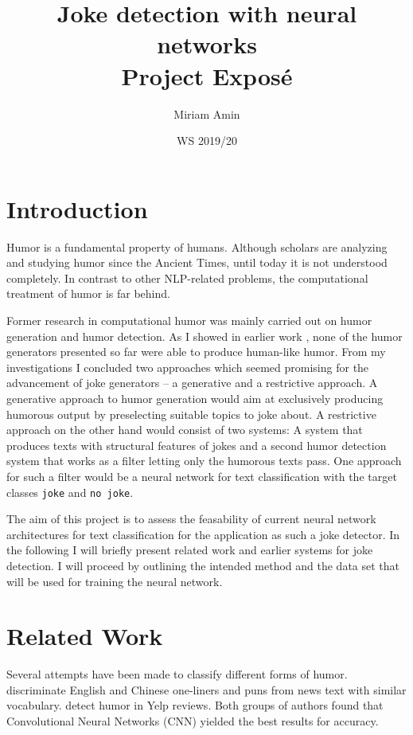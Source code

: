 \documentclass[12pt]{scrartcl}
\title{%
	Joke detection with neural networks \\
	\large Project Exposé}
\author{Miriam Amin}
\date{WS 2019/20}
\begin{document}
\maketitle

\section{Introduction}
Humor is a fundamental property of humans. Although scholars are analyzing and studying humor since the Ancient Times, until today it is not understood completely. In contrast to other NLP-related problems, the computational treatment of humor is far behind. 

Former research in computational humor was mainly carried out on humor generation and humor detection. As I showed in earlier work \citep{aminComputationalHumorAutomatic2019}, none of the humor generators presented so far were able to produce human-like humor. From my investigations I concluded two approaches which seemed promising for the advancement of joke generators -- a generative and a restrictive approach. A generative approach to humor generation would aim at exclusively producing humorous output by preselecting suitable topics to joke about. A restrictive approach on the other hand would consist of two systems: A system that produces texts with structural features of jokes and a second humor detection system that works as a filter letting only the humorous texts pass.  
One approach for such a filter would be a neural network for text classification with the target classes \texttt{joke} and \texttt{no joke}.

The aim of this project is to assess the feasability of current neural network architectures for text classification for the application as such a joke detector. In the following I will briefly present related work and earlier systems for joke detection. I will proceed by outlining the intended method and the data set that will be used for training the neural network. 

 

\section{Related Work}
Several attempts have been made to classify different forms of humor. \cite{chenHumorRecognitionUsing2018} discriminate English and Chinese one-liners and puns from news text with similar vocabulary. \cite{oliveiraHumorDetectionYelp2015} detect humor in Yelp reviews. Both groups of authors found that Convolutional Neural Networks (CNN) yielded the best results for accuracy. 
\end{document}
